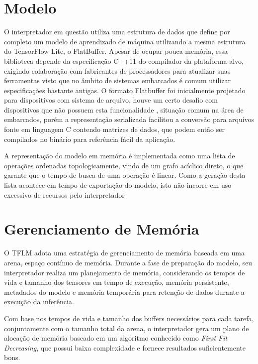 \documentclass[a5paper]{ufsc-thesis}  %
\begin{document}
\section{Modelo}
    O interpretador em questão utiliza uma estrutura de dados que define por completo um modelo de aprendizado de máquina utilizando a mesma estrutura do TensorFlow Lite, o FlatBuffer. Apesar de ocupar pouca memória, essa biblioteca depende da especificação C++11 do compilador da plataforma alvo, exigindo colaboração com fabricantes de processadores para atualizar suas ferramentas visto que no âmbito de sistemas embarcados é comum utilizar especificações bastante antigas. O formato Flatbuffer foi inicialmente projetado para dispositivos com sistema de arquivo, houve um certo desafio com dispositivos que não possuem esta funcionalidade \cite{tflu}, situação comum na área de embarcados, porém a representação serializada facilitou a conversão para arquivos fonte em linguagem C contendo matrizes de dados, que podem então ser compilados no binário para referência fácil da aplicação.

    A representação do modelo em memória é implementada como uma lista de operações ordenadas topologicamente, vindo de um grafo acíclico direto, o que garante que o tempo de busca de uma operação é linear. Como a geração desta lista acontece em tempo de exportação do modelo, isto não incorre em uso excessivo de recursos pelo interpretador

\section{Gerenciamento de Memória}
    O TFLM adota uma estratégia de gerenciamento de memória baseada em uma arena, espaço contínuo de memória. Durante a fase de preparação do modelo, seu interpretador realiza um planejamento de memória, considerando os tempos de vida e tamanho dos tensores em tempo de execução, memória persistente, metadados do modelo e memória temporária para retenção de dados durante a execução da inferência.

    Com base nos tempos de vida e tamanho dos buffers necessários para cada tarefa, conjuntamente com o tamanho total da arena, o interpretador gera um plano de alocação de memória baseado em um algoritmo conhecido como \textit{First Fit Decreasing}, que possui baixa complexidade e fornece resultados suficientemente bons.
\end{document}
